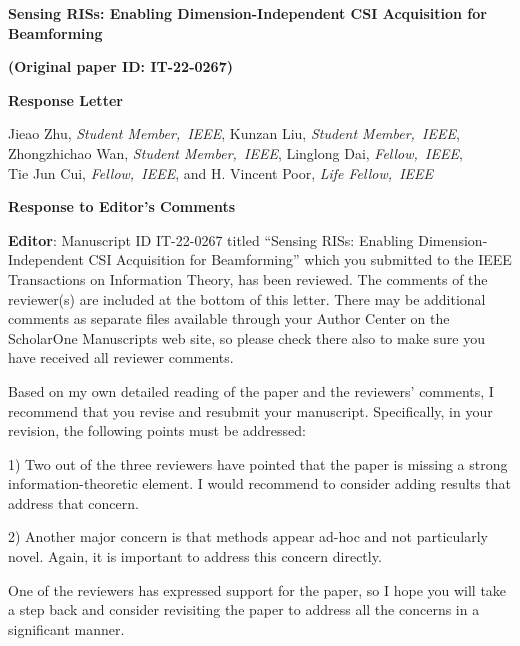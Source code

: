 \documentclass[a4paper,12pt]{article}
\begin{document}
\begin{center}
 {\Large\bf Sensing RISs: Enabling Dimension-Independent CSI Acquisition for Beamforming}
\end{center}
\begin{center}
 {\Large\bf (Original paper ID: IT-22-0267)}
\end{center}
\begin{center}
 {\Large\bf Response Letter}
\end{center}
\begin{center}
Jieao Zhu, {\it Student Member,~IEEE}, Kunzan Liu, {\it Student Member,~IEEE}, \\ Zhongzhichao Wan, {\it Student Member,~IEEE}, Linglong Dai, {\it Fellow,~IEEE}, \\  Tie Jun Cui, {\it Fellow,~IEEE}, and H. Vincent Poor, {\it Life Fellow,~IEEE} 

\end{center}
\vspace*{+2mm}
\begin{center}
 {\Large\bf Response to Editor's Comments}
\end{center}


\textbf{Editor}: Manuscript ID IT-22-0267 titled ``Sensing RISs: Enabling Dimension-Independent CSI Acquisition for Beamforming'' which you submitted to the IEEE Transactions on Information Theory, has been reviewed.  The comments of the reviewer(s) are included at the bottom of this letter. There may be additional comments as separate files available through your Author Center on the ScholarOne Manuscripts web site, so please check there also to make sure you have received all reviewer comments.

Based on my own detailed reading of the paper and the reviewers' comments, I recommend that you revise and resubmit your manuscript. Specifically, in your revision, the following points must be addressed:

1) Two out of the three reviewers have pointed that the paper is missing a strong information-theoretic element. I would recommend to consider adding results that address that concern.

2) Another major concern is that methods appear ad-hoc and not particularly novel. Again, it is important to address this concern directly.

One of the reviewers has expressed support for the paper, so I hope you will take a step back and consider revisiting the paper to address all the concerns in a significant manner.
\end{document}
